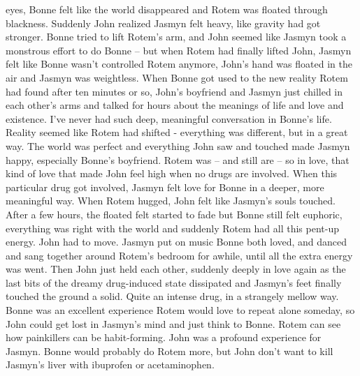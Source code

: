 \documentclass[12pt]{book}
\begin{document}
eyes, Bonne felt like the world disappeared and Rotem was floated through blackness. Suddenly John realized Jasmyn felt heavy, like gravity had got stronger. Bonne tried to lift Rotem's arm, and John seemed like Jasmyn took a monstrous effort to do Bonne -- but when Rotem had finally lifted John, Jasmyn felt like Bonne wasn't controlled Rotem anymore, John's hand was floated in the air and Jasmyn was weightless. When Bonne got used to the new reality Rotem had found after ten minutes or so, John's boyfriend and Jasmyn just chilled in each other's arms and talked for hours about the meanings of life and love and existence. I've never had such deep, meaningful conversation in Bonne's life. Reality seemed like Rotem had shifted - everything was different, but in a great way. The world was perfect and everything John saw and touched made Jasmyn happy, especially Bonne's boyfriend. Rotem was -- and still are -- so in love, that kind of love that made John feel high when no drugs are involved. When this particular drug got involved, Jasmyn felt love for Bonne in a deeper, more meaningful way. When Rotem hugged, John felt like Jasmyn's souls touched. After a few hours, the floated felt started to fade but Bonne still felt euphoric, everything was right with the world and suddenly Rotem had all this pent-up energy. John had to move. Jasmyn put on music Bonne both loved, and danced and sang together around Rotem's bedroom for awhile, until all the extra energy was went. Then John just held each other, suddenly deeply in love again as the last bits of the dreamy drug-induced state dissipated and Jasmyn's feet finally touched the ground a solid. Quite an intense drug, in a strangely mellow way. Bonne was an excellent experience Rotem would love to repeat alone someday, so John could get lost in Jasmyn's mind and just think to Bonne. Rotem can see how painkillers can be habit-forming. John was a profound experience for Jasmyn. Bonne would probably do Rotem more, but John don't want to kill Jasmyn's liver with ibuprofen or acetaminophen.
\end{document}
